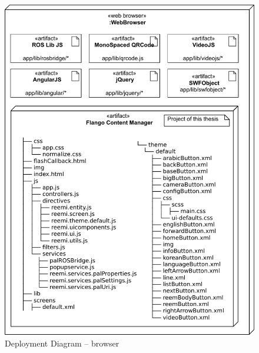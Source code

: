 \begin{figure}[htb]
    \centering
    \includegraphics{figures/design-deployment-browser.pdf}
    \caption{Deployment Diagram -- browser}
    \label{fig:deploy-browser}
\end{figure}

